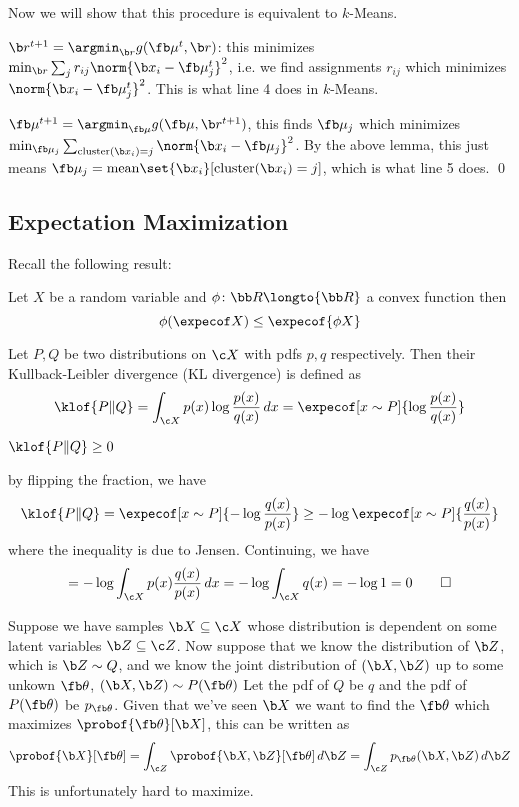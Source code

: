 Now we will show that this procedure is equivalent to {\tencsc $k$-Means}.
\benum
    \item $\b r^{t+1}=\argmin_{\b r}g(\fb\mu^t,\b r)$: this minimizes $\min_{\b r}\sum_jr_{ij}\norm{\b x_i-\fb\mu_j^t}^2$, i.e. we find assignments $r_{ij}$ which minimizes $\norm{\b x_i-\fb\mu_j^t}^2$.
    This is what line 4 does in {\tencsc $k$-Means}.
    \item $\fb\mu^{t+1}=\argmin_{\fb\mu}g(\fb\mu,\b r^{t+1})$, this finds $\fb\mu_j$ which minimizes $\min_{\fb\mu_j}\sum_{{\rm cluster}(\b x_i)=j}\norm{\b x_i-\fb\mu_j}^2$.
    By the above lemma, this just means $\fb\mu_j={\rm mean}\set{\b x_i}[{\rm cluster}(\b x_i)=j]$, which is what line 5 does.
\eenum
\qed

\subsection{Expectation Maximization}

Recall the following result:

\bthrm[title=Jensen's Inequality]

    Let $X$ be a random variable and $\phi\colon{\bb R}\longto{\bb R}$ a convex function then
    $$ \phi(\expecof X) \leq \expecof{\phi X} $$

\ethrm

\bdefn

    Let $P,Q$ be two distributions on $\c X$ with pdfs $p,q$ respectively.
    Then their {\emphcolor Kullback-Leibler divergence} (KL divergence) is defined as
    $$ \klof{P\|Q} = \int_{\c X}p(x)\log\frac{p(x)}{q(x)}\,dx = \expecof[x\sim P]{\log\frac{p(x)}{q(x)}} $$

\edefn

\bthrm

    $\klof{P\|Q}\geq0$

\ethrm

\Proof by flipping the fraction, we have
$$ \klof{P\|Q} = \expecof[x\sim P]{-\log\frac{q(x)}{p(x)}} \geq -\log\expecof[x\sim P]{\frac{q(x)}{p(x)}} $$
where the inequality is due to Jensen.
Continuing, we have
$$ = -\log\int_{\c X}p(x)\frac{q(x)}{p(x)}\,dx = -\log\int_{\c X}q(x) = -\log1 = 0 \qed $$

Suppose we have samples $\b X\subseteq\c X$ whose distribution is dependent on some latent variables $\b Z\subseteq\c Z$.
Now suppose that we know the distribution of $\b Z$, which is $\b Z\sim Q$, and we know the joint distribution of $(\b X,\b Z)$ up to some unkown $\fb\theta$, $(\b X,\b Z)\sim P(\fb\theta)$
Let the pdf of $Q$ be $q$ and the pdf of $P(\fb\theta)$ be $p_{\fb\theta}$.
Given that we've seen $\b X$ we want to find the $\fb\theta$ which maximizes $\probof{\fb\theta}[\b X]$, this can be written as
$$ \probof{\b X}[\fb\theta] = \int_{\c Z}\probof{\b X,\b Z}[\fb\theta]\,d\b Z = \int_{\c Z}p_{\fb\theta}(\b X,\b Z)\,d\b Z $$
This is unfortunately hard to maximize.

